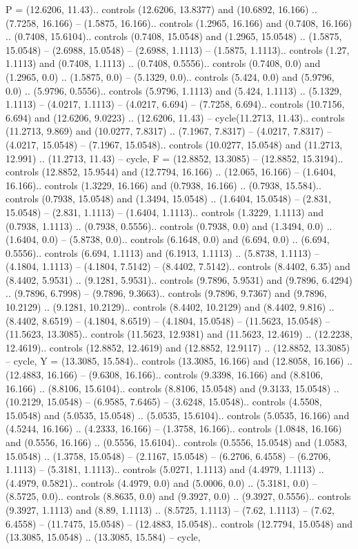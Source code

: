 {P} = {(12.6206, 11.43).. controls (12.6206, 13.8377) and (10.6892, 16.166) .. (7.7258, 16.166) -- (1.5875, 16.166).. controls (1.2965, 16.166) and (0.7408, 16.166) .. (0.7408, 15.6104).. controls (0.7408, 15.0548) and (1.2965, 15.0548) .. (1.5875, 15.0548) -- (2.6988, 15.0548) -- (2.6988, 1.1113) -- (1.5875, 1.1113).. controls (1.27, 1.1113) and (0.7408, 1.1113) .. (0.7408, 0.5556).. controls (0.7408, 0.0) and (1.2965, 0.0) .. (1.5875, 0.0) -- (5.1329, 0.0).. controls (5.424, 0.0) and (5.9796, 0.0) .. (5.9796, 0.5556).. controls (5.9796, 1.1113) and (5.424, 1.1113) .. (5.1329, 1.1113) -- (4.0217, 1.1113) -- (4.0217, 6.694) -- (7.7258, 6.694).. controls (10.7156, 6.694) and (12.6206, 9.0223) .. (12.6206, 11.43) -- cycle(11.2713, 11.43).. controls (11.2713, 9.869) and (10.0277, 7.8317) .. (7.1967, 7.8317) -- (4.0217, 7.8317) -- (4.0217, 15.0548) -- (7.1967, 15.0548).. controls (10.0277, 15.0548) and (11.2713, 12.991) .. (11.2713, 11.43) -- cycle},
{F} = {(12.8852, 13.3085) -- (12.8852, 15.3194).. controls (12.8852, 15.9544) and (12.7794, 16.166) .. (12.065, 16.166) -- (1.6404, 16.166).. controls (1.3229, 16.166) and (0.7938, 16.166) .. (0.7938, 15.584).. controls (0.7938, 15.0548) and (1.3494, 15.0548) .. (1.6404, 15.0548) -- (2.831, 15.0548) -- (2.831, 1.1113) -- (1.6404, 1.1113).. controls (1.3229, 1.1113) and (0.7938, 1.1113) .. (0.7938, 0.5556).. controls (0.7938, 0.0) and (1.3494, 0.0) .. (1.6404, 0.0) -- (5.8738, 0.0).. controls (6.1648, 0.0) and (6.694, 0.0) .. (6.694, 0.5556).. controls (6.694, 1.1113) and (6.1913, 1.1113) .. (5.8738, 1.1113) -- (4.1804, 1.1113) -- (4.1804, 7.5142) -- (8.4402, 7.5142).. controls (8.4402, 6.35) and (8.4402, 5.9531) .. (9.1281, 5.9531).. controls (9.7896, 5.9531) and (9.7896, 6.4294) .. (9.7896, 6.7998) -- (9.7896, 9.3663).. controls (9.7896, 9.7367) and (9.7896, 10.2129) .. (9.1281, 10.2129).. controls (8.4402, 10.2129) and (8.4402, 9.816) .. (8.4402, 8.6519) -- (4.1804, 8.6519) -- (4.1804, 15.0548) -- (11.5623, 15.0548) -- (11.5623, 13.3085).. controls (11.5623, 12.9381) and (11.5623, 12.4619) .. (12.2238, 12.4619).. controls (12.8852, 12.4619) and (12.8852, 12.9117) .. (12.8852, 13.3085) -- cycle},
{Y} = {(13.3085, 15.584).. controls (13.3085, 16.166) and (12.8058, 16.166) .. (12.4883, 16.166) -- (9.6308, 16.166).. controls (9.3398, 16.166) and (8.8106, 16.166) .. (8.8106, 15.6104).. controls (8.8106, 15.0548) and (9.3133, 15.0548) .. (10.2129, 15.0548) -- (6.9585, 7.6465) -- (3.6248, 15.0548).. controls (4.5508, 15.0548) and (5.0535, 15.0548) .. (5.0535, 15.6104).. controls (5.0535, 16.166) and (4.5244, 16.166) .. (4.2333, 16.166) -- (1.3758, 16.166).. controls (1.0848, 16.166) and (0.5556, 16.166) .. (0.5556, 15.6104).. controls (0.5556, 15.0548) and (1.0583, 15.0548) .. (1.3758, 15.0548) -- (2.1167, 15.0548) -- (6.2706, 6.4558) -- (6.2706, 1.1113) -- (5.3181, 1.1113).. controls (5.0271, 1.1113) and (4.4979, 1.1113) .. (4.4979, 0.5821).. controls (4.4979, 0.0) and (5.0006, 0.0) .. (5.3181, 0.0) -- (8.5725, 0.0).. controls (8.8635, 0.0) and (9.3927, 0.0) .. (9.3927, 0.5556).. controls (9.3927, 1.1113) and (8.89, 1.1113) .. (8.5725, 1.1113) -- (7.62, 1.1113) -- (7.62, 6.4558) -- (11.7475, 15.0548) -- (12.4883, 15.0548).. controls (12.7794, 15.0548) and (13.3085, 15.0548) .. (13.3085, 15.584) -- cycle},
